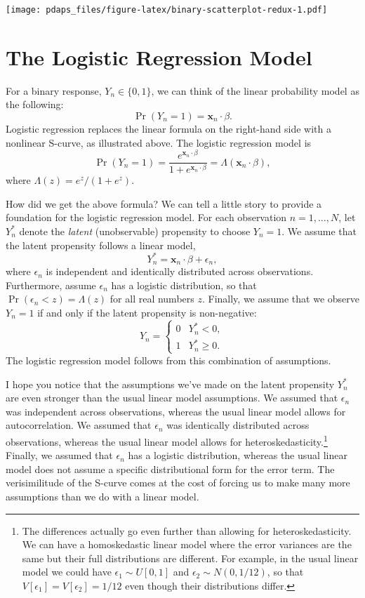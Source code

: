 \documentclass[
  12pt,
  oneside,openany]{book}
\begin{document}
\texttt{[image: pdaps\_files/figure-latex/binary-scatterplot-redux-1.pdf]}

\hypertarget{the-logistic-regression-model}{%
\section{The Logistic Regression Model}\label{the-logistic-regression-model}}

For a binary response, \(Y_n \in \{0, 1\}\), we can think of the linear probability model as the following:
\[
\Pr(Y_n = 1) = \mathbf{x}_n \cdot \beta.
\]
Logistic regression replaces the linear formula on the right-hand side with a nonlinear S-curve, as illustrated above.
The logistic regression model is
\[
\Pr(Y_n = 1) = \frac{e^{\mathbf{x}_n \cdot \beta}}{1 + e^{\mathbf{x}_n \cdot \beta}} = \Lambda(\mathbf{x}_n \cdot \beta),
\]
where \(\Lambda(z) = e^z / (1 + e^z)\).

How did we get the above formula?
We can tell a little story to provide a foundation for the logistic regression model.
For each observation \(n = 1, \ldots, N\), let \(Y_n^*\) denote the \emph{latent} (unobservable) propensity to choose \(Y_n = 1\).
We assume that the latent propensity follows a linear model,
\[
Y_n^* = \mathbf{x}_n \cdot \beta + \epsilon_n,
\]
where \(\epsilon_n\) is independent and identically distributed across observations.
Furthermore, assume \(\epsilon_n\) has a logistic distribution, so that \(\Pr(\epsilon_n < z) = \Lambda(z)\) for all real numbers \(z\).
Finally, we assume that we observe \(Y_n = 1\) if and only if the latent propensity is non-negative:
\[
Y_n = \begin{cases}
0 & Y_n^* < 0, \\
1 & Y_n^* \geq 0.
\end{cases}
\]
The logistic regression model follows from this combination of assumptions.

I hope you notice that the assumptions we've made on the latent propensity \(Y_n^*\) are even stronger than the usual linear model assumptions.
We assumed that \(\epsilon_n\) was independent across observations, whereas the usual linear model allows for autocorrelation.
We assumed that \(\epsilon_n\) was identically distributed across observations, whereas the usual linear model allows for heteroskedasticity.\footnote{The differences actually go even further than allowing for heteroskedasticity. We can have a homoskedastic linear model where the error variances are the same but their full distributions are different. For example, in the usual linear model we could have \(\epsilon_1 \sim U[0, 1]\) and \(\epsilon_2 \sim N(0, 1/12)\), so that \(V[\epsilon_1] = V[\epsilon_2] = 1/12\) even though their distributions differ.}
Finally, we assumed that \(\epsilon_n\) has a logistic distribution, whereas the usual linear model does not assume a specific distributional form for the error term.
The verisimilitude of the S-curve comes at the cost of forcing us to make many more assumptions than we do with a linear model.
\end{document}
